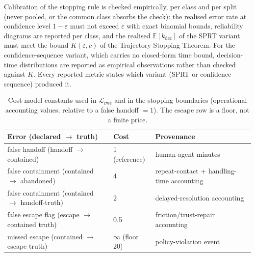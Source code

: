 Calibration of the stopping rule is checked empirically, per class and per split (never pooled, or the common class absorbs the check): the realised error rate at confidence level $1-\varepsilon$ must not exceed $\varepsilon$ with exact binomial bounds, reliability diagrams are reported per class, and the realised $\mathbb{E}[k_{\mathrm{dec}}]$ of the SPRT variant must meet the bound $K(\varepsilon, c)$ of the Trajectory Stopping Theorem.
For the confidence-sequence variant, which carries no closed-form time bound, decision-time distributions are reported as empirical observations rather than checked against $K$.
Every reported metric states which variant (SPRT or confidence sequence) produced it.

\begin{table}[t]
\centering
\caption{Cost-model constants used in $\mathcal{L}_{\mathrm{cwe}}$ and in the stopping
         boundaries (operational accounting values; relative to a false handoff $= 1$).
         The escape row is a floor, not a finite price.}
\label{tab:costmodel}
\small
\begin{tabular}{lll}
\toprule
Error (declared $\to$ truth) & Cost & Provenance \\
\midrule
false handoff (handoff $\to$ contained) & 1 (reference) & human-agent minutes \\
false containment (contained $\to$ abandoned) & 4 & repeat-contact + handling-time accounting \\
false containment (contained $\to$ handoff-truth) & 2 & delayed-resolution accounting \\
false escape flag (escape $\to$ contained truth) & 0.5 & friction/trust-repair accounting \\
missed escape (contained $\to$ escape truth) & $\infty$ (floor 20) & policy-violation event \\
\bottomrule
\end{tabular}
\end{table}

